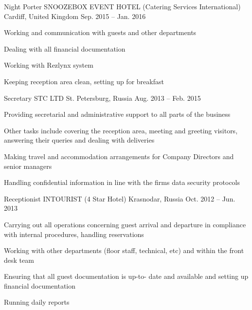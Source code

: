 \begin{cventries}
  \cventry
    {Night Porter} %
    {SNOOZEBOX EVENT HOTEL (Catering Services International)} %
    {Cardiff, United Kingdom} %
    {Sep. 2015 -- Jan. 2016} %
    {
      \begin{cvitems} %
        \item {Working and communication with guests and other departments}
        \item {Dealing with all financial documentation}
        \item {Working with Rezlynx system}
        \item {Keeping reception area clean, setting up for breakfast}
      \end{cvitems}
    }

  \cventry
    {Secretary} %
    {STC LTD} %
    {St. Petersburg, Russia} %
    {Aug. 2013 -- Feb. 2015} %
    {
      \begin{cvitems} %
        \item {Providing secretarial and administrative support to all parts of the business}
        \item {Other tasks include covering the reception area, meeting and greeting visitors, answering their queries and dealing with deliveries}
        \item {Making travel and accommodation arrangements for Company Directors and senior managers}
        \item {Handling confidential information in line with the firms data security protocols}
      \end{cvitems}
    }

  \cventry
    {Receptionist} %
    {INTOURIST (4 Star Hotel)} %
    {Krasnodar, Russia} %
    {Oct. 2012 -- Jun. 2013} %
    {
      \begin{cvitems} %
        \item {Carrying out all operations concerning guest arrival and departure in compliance with internal procedures, handling reservations}
        \item {Working with other departments (floor staff, technical, etc) and within the front desk team}
        \item {Ensuring that all guest documentation is up-to- date and available and setting up financial documentation}
        \item {Running daily reports}
      \end{cvitems}
    }


\end{cventries}

